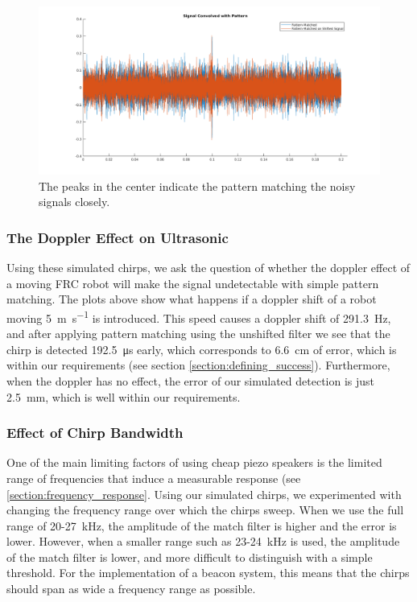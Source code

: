 \documentclass{article}
\begin{document}
    \begin{figure}
      \centering
      \includegraphics[width=1\linewidth]{./images/pattern_matching.png}
      \caption{The peaks in the center indicate the pattern matching the noisy signals closely.}
      \label{fig:pattern_matching}
    \end{figure}

    \subsubsection{The Doppler Effect on Ultrasonic}

      Using these simulated chirps, we ask the question of whether the doppler effect of a moving FRC robot will make the signal undetectable with simple pattern matching. The plots above show what happens if a doppler shift of a robot moving \SI{5}{\meter\per\second} is introduced. This speed causes a doppler shift of \SI{291.3}{\hertz}, and after applying pattern matching using the unshifted filter we see that the chirp is detected \SI{192.5}{\micro\second} early, which corresponds to \SI{6.6}{\centi\meter} of error, which is within our requirements (see section \ref{section:defining_success}). Furthermore, when the doppler has no effect, the error of our simulated detection is just \SI{2.5}{\milli\meter}, which is well within our requirements.

    \subsubsection{Effect of Chirp Bandwidth}

      One of the main limiting factors of using cheap piezo speakers is the limited range of frequencies that induce a measurable response (see \ref{section:frequency_response}. Using our simulated chirps, we experimented with changing the frequency range over which the chirps sweep. When we use the full range of 20-27\SI{}{\kilo\hertz}, the amplitude of the match filter is higher and the error is lower. However, when a smaller range such as 23-24\SI{}{\kilo\hertz} is used, the amplitude of the match filter is lower, and more difficult to distinguish with a simple threshold. For the implementation of a beacon system, this means that the chirps should span as wide a frequency range as possible.
\end{document}
